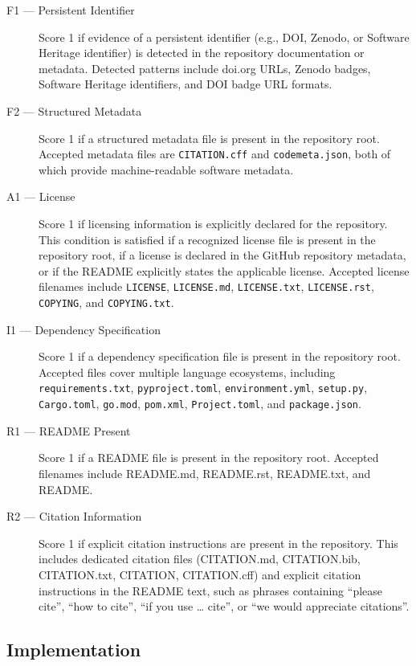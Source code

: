 \begin{description}
\item[F1 --- Persistent Identifier] Score 1 if evidence of a persistent identifier (e.g., DOI, Zenodo,
or Software Heritage identifier) is detected in the repository
documentation or metadata. Detected patterns include 
doi.org URLs, Zenodo badges, Software Heritage identifiers, and 
DOI badge URL formats.

\item[F2 --- Structured Metadata] Score 1 if a structured metadata 
file is present in the repository root. Accepted metadata files are 
\texttt{CITATION.cff} and \texttt{codemeta.json}, both of which 
provide machine-readable software metadata.

\item[A1 --- License] Score 1 if licensing information is explicitly
declared for the repository. This condition is satisfied if a
recognized license file is present in the repository root, if a
license is declared in the GitHub repository metadata, or if the
README explicitly states the applicable license. Accepted license
filenames include \texttt{LICENSE}, \texttt{LICENSE.md},
\texttt{LICENSE.txt}, \texttt{LICENSE.rst}, \texttt{COPYING}, and
\texttt{COPYING.txt}.


\item[I1 --- Dependency Specification] Score 1 if a dependency 
specification file is present in the repository root. Accepted 
files cover multiple language ecosystems, including 
\texttt{requirements.txt}, \texttt{pyproject.toml}, 
\texttt{environment.yml}, \texttt{setup.py}, \texttt{Cargo.toml}, 
\texttt{go.mod}, \texttt{pom.xml}, \texttt{Project.toml}, and 
\texttt{package.json}.

\item[R1 --- README Present] Score 1 if a README file is present 
in the repository root. Accepted filenames include README.md, 
README.rst, README.txt, and README.

\item[R2 --- Citation Information] Score 1 if explicit citation 
instructions are present in the repository. This includes dedicated 
citation files (CITATION.md, CITATION.bib, CITATION.txt, CITATION, 
CITATION.cff) and explicit citation instructions in the README text, 
such as phrases containing ``please cite'', ``how to cite'', ``if you 
use \ldots{} cite'', or ``we would appreciate citations''.
\end{description}

\subsection{Implementation}

